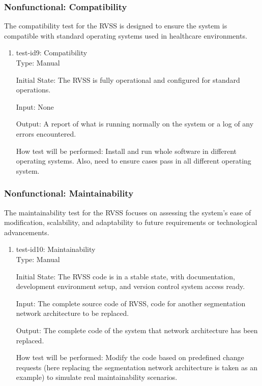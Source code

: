 \documentclass[12pt, titlepage]{article}
\begin{document}
\subsubsection{Nonfunctional: Compatibility}
\label{non_functional_compatibility}		
The compatibility test for the RVSS is designed to ensure 
the system is compatible with standard operating systems
used in healthcare environments.
\begin{enumerate}
					
\item{test-id9: Compatibility\\}
\label{test-id-9}
Type: Manual
					
Initial State: The RVSS is fully operational and configured for standard operations. 
					
Input: None 
					
Output: A report of what is running normally on the system or a log of any errors encountered.
					
How test will be performed: Install and run whole software in different operating systems. Also, need to ensure cases pass in all different operating system.
\end{enumerate}

\subsubsection{Nonfunctional: Maintainability}
\label{non_functional_maintainability}		
The maintainability test for the RVSS focuses on assessing the system's ease of modification, scalability, and adaptability to future requirements or technological advancements. 
\begin{enumerate}
					
\item{test-id10: Maintainability\\}
\label{test-id-10}
Type: Manual
					
Initial State: The RVSS code is in a stable state, with documentation, development environment setup, and version control system access ready. 
					
Input: The complete source code of RVSS, 
code for another segmentation network architecture to be replaced.
					
Output: The complete code of the system that network architecture has been replaced. 
					
How test will be performed: Modify the code based on predefined change requests (here replacing the segmentation network architecture is taken as an example) to simulate real maintainability scenarios.
\end{enumerate}
\end{document}
